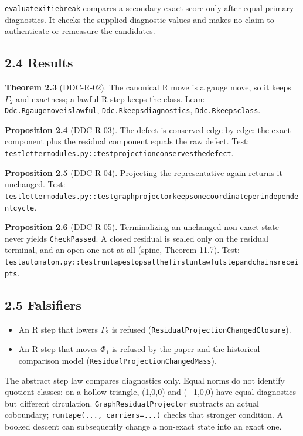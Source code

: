 \documentclass[
  11pt,
]{article}
\providecommand{\tightlist}{%
  \setlength{\itemsep}{0pt}\setlength{\parskip}{0pt}}
\renewcommand{\_}{\ddcunderscore\allowbreak}
\begin{document}
\texttt{evaluate\_xi\_tie\_break} compares a secondary exact score only
after equal primary diagnostics. It checks the supplied diagnostic
values and makes no claim to authenticate or remeasure the candidates.

\subsection{2.4 Results}\label{results-1}

\textbf{Theorem 2.3} (DDC-R-02). The canonical R move is a gauge move,
so it keeps \(\Gamma_2\) and exactness; a lawful R step keeps the class.
Lean: \texttt{Ddc.\allowbreak R\_gauge\_move\_is\_lawful},
\texttt{Ddc.\allowbreak R\_keeps\_diagnostics}, \texttt{Ddc.\allowbreak R\_keeps\_class}.

\textbf{Proposition 2.4} (DDC-R-03). The defect is conserved edge by
edge: the exact component plus the residual component equals the raw
defect. Test:
\texttt{test\_letter\_modules.\allowbreak py::test\_projection\_conserves\_the\_defect}.

\textbf{Proposition 2.5} (DDC-R-04). Projecting the representative again
returns it unchanged. Test:
\texttt{test\_letter\_modules.\allowbreak py::test\_graph\_projector\_keeps\_one\_coordinate\_per\_independent\_cycle}.

\textbf{Proposition 2.6} (DDC-R-05). Terminalizing an unchanged
non-exact state never yields \texttt{Check\allowbreak Passed}. A closed residual is
sealed only on the residual terminal, and an open one not at all (spine,
Theorem 11.7). Test:
\texttt{test\_automaton.\allowbreak py::test\_run\_tape\_stops\_at\_the\_first\_unlawful\_step\_and\_chains\_receipts}.

\subsection{2.5 Falsifiers}\label{falsifiers-1}

\begin{itemize}
\tightlist
\item
  An R step that lowers \(\Gamma_2\) is refused
  (\texttt{Residual\allowbreak Projection\allowbreak Changed\allowbreak Closure}).
\item
  An R step that moves \(\Phi_1\) is refused by the paper and the
  historical comparison model (\texttt{Residual\allowbreak Projection\allowbreak Changed\allowbreak Mass}).
\end{itemize}

The abstract step law compares diagnostics only. Equal norms do not
identify quotient classes: on a hollow triangle, (1,0,0) and (−1,0,0)
have equal diagnostics but different circulation.
\texttt{Graph\allowbreak Residual\allowbreak Projector} subtracts an actual coboundary;
\texttt{run\_tape(.\allowbreak .\allowbreak .\allowbreak ,\ carriers=.\allowbreak .\allowbreak .\allowbreak )} checks that stronger condition. A
booked descent can subsequently change a non-exact state into an exact
one.
\end{document}
